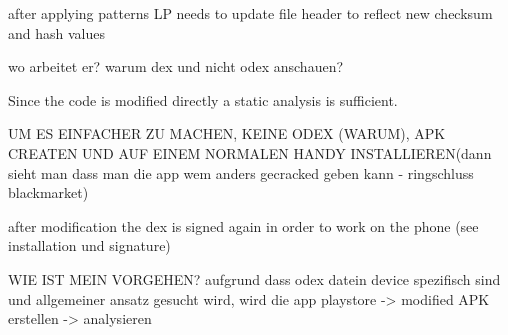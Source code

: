 after applying patterns LP needs to update file header to reflect new checksum and hash values

\cite{munteanLicense}
%

wo arbeitet er?\newline
warum dex und nicht odex anschauen?\newline

Since the code is modified directly a static analysis is sufficient.\newline

UM ES EINFACHER ZU MACHEN, KEINE ODEX (WARUM), APK CREATEN UND AUF EINEM NORMALEN HANDY INSTALLIEREN(dann sieht man dass man die app wem anders gecracked geben kann - ringschluss blackmarket)\newline

after modification the dex is signed again in order to work on the phone (see installation und signature)

WIE IST MEIN VORGEHEN?
aufgrund dass odex datein device spezifisch sind und allgemeiner ansatz gesucht wird, wird die
app playstore -> modified APK erstellen -> analysieren
